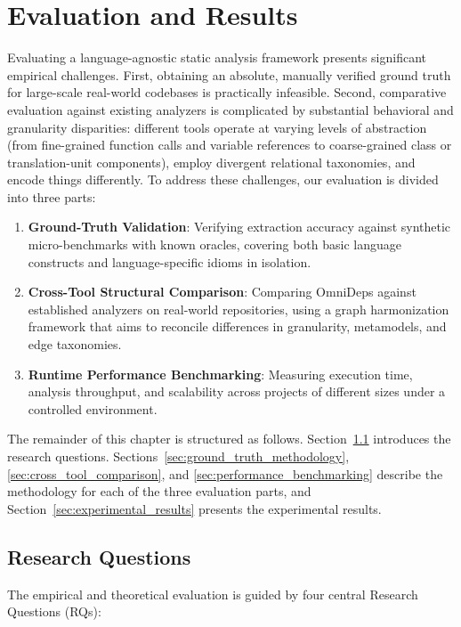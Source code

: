 \chapter{Evaluation and Results}
\label{ch:evaluation_results}

Evaluating a language-agnostic static analysis framework presents
significant empirical challenges. First, obtaining an absolute,
manually verified ground truth for large-scale real-world codebases
is practically infeasible. Second, comparative evaluation against
existing analyzers is complicated by substantial behavioral and
granularity disparities: different tools operate at varying levels of
abstraction (from fine-grained function calls and variable references
to coarse-grained class or translation-unit components), employ
divergent relational taxonomies, and encode things differently.
To address these challenges, our evaluation is divided into three parts:
\begin{enumerate}
  \item \textbf{Ground-Truth Validation}: Verifying extraction
    accuracy against synthetic micro-benchmarks with known oracles,
    covering both basic language constructs and language-specific
    idioms in isolation.
  \item \textbf{Cross-Tool Structural Comparison}: Comparing OmniDeps
    against established analyzers on real-world repositories, using a
    graph harmonization framework that aims to reconcile differences in
    granularity, metamodels, and edge taxonomies.
  \item \textbf{Runtime Performance Benchmarking}: Measuring
    execution time, analysis throughput, and scalability across
    projects of different sizes under a controlled environment.
\end{enumerate}

The remainder of this chapter is structured as follows.
Section~\ref{sec:research_questions} introduces the research
questions. Sections~\ref{sec:ground_truth_methodology},
\ref{sec:cross_tool_comparison}, and
\ref{sec:performance_benchmarking} describe the methodology for each
of the three evaluation parts, and
Section~\ref{sec:experimental_results} presents the experimental results.

\section{Research Questions}
\label{sec:research_questions}

The empirical and theoretical evaluation is guided by four central
Research Questions (RQs):

